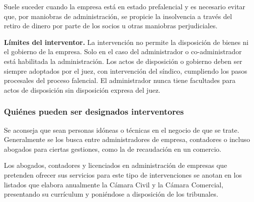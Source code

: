 \documentclass[12pt,oneside]{book}
\begin{document}
Suele suceder cuando la empresa está en estado prefalencial y es necesario evitar que, por maniobras de administración, se propicie la insolvencia a través del retiro de dinero por parte de los socios u otras maniobras perjudiciales.

\begin{important}
\textbf{Límites del interventor.} La intervención no permite la disposición de bienes ni el gobierno de la empresa. Solo en el caso del administrador o co-administrador está habilitada la administración. Los actos de disposición o gobierno deben ser siempre adoptados por el juez, con intervención del síndico, cumpliendo los pasos procesales del proceso falencial. El administrador nunca tiene facultades para actos de disposición sin disposición expresa del juez.
\end{important}

\subsubsection{Quiénes pueden ser designados interventores}

Se aconseja que sean personas idóneas o técnicas en el negocio de que se trate. Generalmente se los busca entre administradores de empresa, contadores o incluso abogados para ciertas gestiones, como la de recaudación en un comercio.

Los abogados, contadores y licenciados en administración de empresas que pretenden ofrecer sus servicios para este tipo de intervenciones se anotan en los listados que elabora anualmente la Cámara Civil y la Cámara Comercial, presentando su currículum y poniéndose a disposición de los tribunales.
\end{document}
